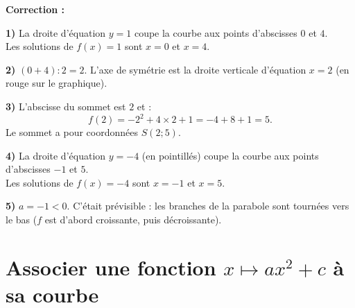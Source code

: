 \documentclass[11pt,a4paper]{book}
\begin{document}
\medskip
\noindent\textbf{\color{red!75!black}Correction :}

\smallskip
\begin{corrBox}
	\textbf{1)} La droite d'équation $y=1$ coupe la courbe aux points d'abscisses $0$ et $4$.\\
	Les solutions de $f(x)=1$ sont $x=0$ et $x=4$.
\end{corrBox}

\medskip
\begin{corrBox}
	\textbf{2)} $(0+4):2=2$. L'axe de symétrie est la droite verticale d'équation $x=2$ (en rouge sur le graphique).
\end{corrBox}

\medskip
\begin{corrBox}
	\textbf{3)} L'abscisse du sommet est $2$ et :
	$$f(2)=-2^2+4\times2+1=-4+8+1=5.$$
	Le sommet a pour coordonnées $S(2 ; 5)$.
\end{corrBox}

\medskip
\begin{corrBox}
	\textbf{4)} La droite d'équation $y=-4$ (en pointillés) coupe la courbe aux points d'abscisses $-1$ et $5$.\\
	Les solutions de $f(x)=-4$ sont $x=-1$ et $x=5$.
\end{corrBox}

\medskip
\begin{corrBox}
	\textbf{5)} $a=-1<0$. C'était prévisible : les branches de la parabole sont tournées vers le bas ($f$ est d'abord croissante, puis décroissante).
\end{corrBox}

\section*{\color{green!55!black}Associer une fonction $x\mapsto ax^2+c$ à sa courbe}

\exerciceDS{}
\end{document}
